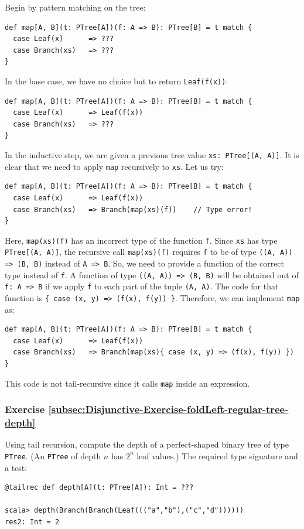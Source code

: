 Begin by pattern matching on the tree:
\begin{lstlisting}
def map[A, B](t: PTree[A])(f: A => B): PTree[B] = t match {
  case Leaf(x)      => ???
  case Branch(xs)   => ???
}
\end{lstlisting}
In the base case, we have no choice but to return \lstinline!Leaf(f(x))!:
\begin{lstlisting}
def map[A, B](t: PTree[A])(f: A => B): PTree[B] = t match {
  case Leaf(x)      => Leaf(f(x))
  case Branch(xs)   => ???
}
\end{lstlisting}
In the inductive step, we are given a previous tree value \lstinline!xs: PTree[(A, A)]!.
It is clear that we need to apply \lstinline!map! recursively to
\lstinline!xs!. Let us try:
\begin{lstlisting}
def map[A, B](t: PTree[A])(f: A => B): PTree[B] = t match {
  case Leaf(x)      => Leaf(f(x))
  case Branch(xs)   => Branch(map(xs)(f))    // Type error!
}
\end{lstlisting}
Here, \lstinline!map(xs)(f)! has an incorrect type of the function
\lstinline!f!. Since \lstinline!xs! has type \lstinline!PTree[(A, A)]!,
the recursive call \lstinline!map(xs)(f)! requires \lstinline!f!
to be of type \lstinline!((A, A)) => (B, B)! instead of \lstinline!A => B!.
So, we need to provide a function of the correct type instead of \lstinline!f!.
A function of type \lstinline!((A, A)) => (B, B)! will be obtained
out of \lstinline!f: A => B! if we apply \lstinline!f! to each part
of the tuple \lstinline!(A, A)!. The code for that function is \lstinline!{ case (x, y) => (f(x), f(y)) }!.
Therefore, we can implement \lstinline!map! as:
\begin{lstlisting}
def map[A, B](t: PTree[A])(f: A => B): PTree[B] = t match {
  case Leaf(x)      => Leaf(f(x))
  case Branch(xs)   => Branch(map(xs){ case (x, y) => (f(x), f(y)) })
}
\end{lstlisting}
This code is not tail-recursive since it calls \lstinline!map! inside
an expression.

\subsubsection{Exercise \label{subsec:Disjunctive-Exercise-foldLeft-regular-tree-depth}\ref{subsec:Disjunctive-Exercise-foldLeft-regular-tree-depth}}

Using tail recursion, compute the depth of a perfect-shaped binary
tree of type \lstinline!PTree!. (An \lstinline!PTree! of depth $n$
has $2^{n}$ leaf values.) The required type signature and a test:
\begin{lstlisting}
@tailrec def depth[A](t: PTree[A]): Int = ???

scala> depth(Branch(Branch(Leaf((("a","b"),("c","d"))))))
res2: Int = 2
\end{lstlisting}

